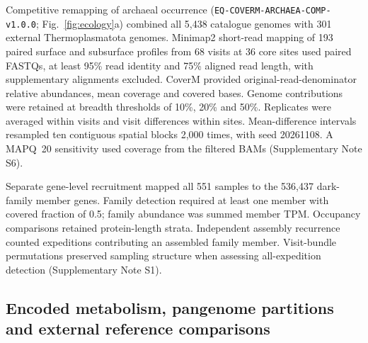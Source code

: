 \documentclass[11pt]{article}
\begin{document}
Competitive remapping of archaeal occurrence (\texttt{EQ-COVERM-ARCHAEA-COMP-v1.0.0}; Fig.~\ref{fig:ecology}a) combined all 5,438 catalogue genomes with 301 external Thermoplasmatota genomes. Minimap2 short-read mapping of 193 paired surface and subsurface profiles from 68 visits at 36 core sites used paired FASTQs, at least 95\% read identity and 75\% aligned read length, with supplementary alignments excluded. CoverM provided original-read-denominator relative abundances, mean coverage and covered bases. Genome contributions were retained at breadth thresholds of 10\%, 20\% and 50\%. Replicates were averaged within visits and visit differences within sites. Mean-difference intervals resampled ten contiguous spatial blocks 2,000 times, with seed 20261108. A MAPQ~20 sensitivity used coverage from the filtered BAMs (Supplementary Note S6).

Separate gene-level recruitment mapped all 551 samples to the 536,437 dark-family member genes. Family detection required at least one member with covered fraction of 0.5; family abundance was summed member TPM. Occupancy comparisons retained protein-length strata. Independent assembly recurrence counted expeditions contributing an assembled family member. Visit-bundle permutations preserved sampling structure when assessing all-expedition detection (Supplementary Note S1).

\subsection*{Encoded metabolism, pangenome partitions and external reference comparisons}
\end{document}
